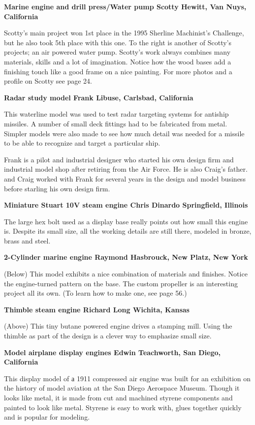 \bigskip
\textbf{Marine engine and drill press/Water pump Scotty Hewitt, Van Nuys,
California}

Scotty's main project won 1st place in the 1995 Sherline Machinist's Challenge,
but he also took 5th place with this one. To the right is another of Scotty's
projects; an air powered water pump. Scotty's work always combines many
materials, skills and a lot of imagination. Notice how the wood bases add a
finishing touch like a good frame on a nice painting. For more photos and a
profile on Scotty see page 24.

\bigskip
\textbf{Radar study model
Frank Libuse, Carlsbad, California}

This waterline model was used to test radar targeting systems for antiship
missiles. A number of small deck fittings had to be fabricated from metal.
Simpler models were also made to see how much detail was needed for a missile to
be able to recognize and target a particular ship.

Frank is a pilot and industrial designer who started his own design firm and
industrial model shop after retiring from the Air Force. He is also Craig's
father. and Craig worked with Frank for several years in the design and model
business before starling his own design firm.

\bigskip
\textbf{Miniature Stuart 10V steam engine Chris Dinardo Springfield, Illinois}

The large hex bolt used as a display base really points out how small this
engine is. Despite its small size, all the working details are still there,
modeled in bronze, brass and steel.

\bigskip
\textbf{2-Cylinder marine engine
Raymond Hasbrouck, New Platz, New York}

(Below) This model exhibits a nice combination of materials and finishes. Notice
the engine-turned pattern on the base. The custom propeller is an interesting
project all its own. (To learn how to make one, see page 56.)

\bigskip
\textbf{Thimble steam engine Richard Long Wichita, Kansas}

(Above) This tiny butane powered engine drives a stamping mill. Using the
thimble as part of the design is a clever way to emphasize small size.

\bigskip
\textbf{Model airplane display engines
Edwin Teachworth, San Diego, California}

This display model of а 1911 compressed air engine was built for an exhibition
on the history of model aviation at the San Diego Aerospace Museum. Though it
looks like metal, it is made from cut and machined styrene components and
painted to look like metal. Styrene is easy to work with, glues together quickly
and is popular for modeling.

